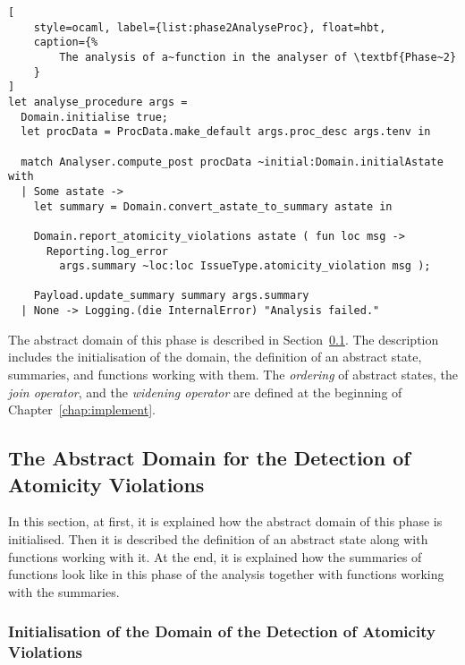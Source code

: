 \begin{lstlisting}[
    style=ocaml, label={list:phase2AnalyseProc}, float=hbt,
    caption={%
        The analysis of a~function in the analyser of \textbf{Phase~2}
    }
]
let analyse_procedure args =
  Domain.initialise true;
  let procData = ProcData.make_default args.proc_desc args.tenv in

  match Analyser.compute_post procData ~initial:Domain.initialAstate with
  | Some astate ->
    let summary = Domain.convert_astate_to_summary astate in

    Domain.report_atomicity_violations astate ( fun loc msg ->
      Reporting.log_error
        args.summary ~loc:loc IssueType.atomicity_violation msg );

    Payload.update_summary summary args.summary
  | None -> Logging.(die InternalError) "Analysis failed."
\end{lstlisting}

The abstract domain of this phase is described in
Section~\ref{sec:implementPhase2Domain}. The description includes the
initialisation of the domain, the definition of an abstract state, 
summaries, and functions working with them. The \emph{ordering} of abstract
states, the \emph{join operator}, and the \emph{widening operator} are 
defined at the beginning of Chapter~\ref{chap:implement}.


\subsection{The Abstract Domain for the Detection of Atomicity Violations}
\label{sec:implementPhase2Domain}

In this section, at first, it is explained how the abstract domain of this
phase is initialised. Then it is described the definition of an abstract
state along with functions working with it. At the end, it is explained how 
the summaries of functions look like in this phase of the analysis together 
with functions working with the summaries.

\subsubsection{%
    Initialisation of the Domain of the Detection of Atomicity Violations
}

